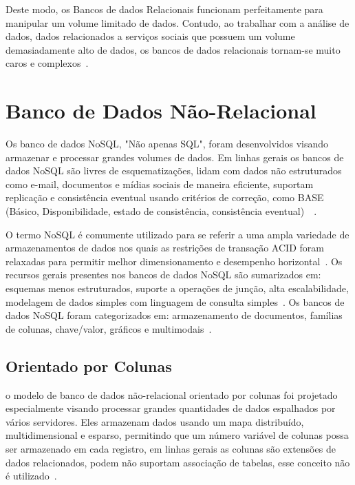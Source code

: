 \documentclass[a4paper,12pt,onecolumn,titlepage]{article}
\begin{document}
Deste modo, os Bancos de dados Relacionais funcionam perfeitamente para manipular um volume limitado de dados. Contudo, ao trabalhar com a análise de dados, dados relacionados a serviços sociais que possuem um volume demasiadamente alto de dados, os bancos de dados relacionais tornam-se muito caros e complexos~\citep{ramesh:2016}.

\section{Banco de Dados Não-Relacional}
\label{sec:nao-relacional}

Os banco de dados NoSQL, "Não apenas SQL", foram desenvolvidos visando armazenar e processar grandes volumes de dados. Em linhas gerais os bancos de dados NoSQL são livres de esquematizações, lidam com dados não estruturados como e-mail, documentos e mídias sociais de maneira eficiente, suportam replicação e consistência eventual usando critérios de correção, como BASE (Básico, Disponibilidade, estado de consistência, consistência eventual)~\citep{mohamed:2014}~\citep{ramesh:2016}.

O termo NoSQL é comumente utilizado para se referir a uma ampla variedade de armazenamentos de dados nos quais as restrições de transação ACID foram relaxadas para permitir melhor dimensionamento e desempenho horizontal~\citep{rafique:2018}. Os recursos gerais presentes nos bancos de dados NoSQL são sumarizados em: esquemas menos estruturados, suporte a operações de junção, alta escalabilidade, modelagem de dados simples com linguagem de consulta simples~\citep{ramesh:2016}. Os bancos de dados NoSQL foram categorizados em: armazenamento de documentos, famílias de colunas, chave/valor, gráficos e multimodais~\citep{aparicio:2016}.

\subsection{Orientado por Colunas}
\label{subsec:colunas}

o modelo de banco de dados não-relacional orientado por colunas foi projetado especialmente visando processar grandes quantidades de dados espalhados por vários servidores. Eles armazenam dados usando um mapa distribuído, multidimensional e esparso, permitindo que um número variável de colunas possa ser armazenado em cada registro, em linhas gerais as colunas são extensões de dados relacionados, podem não suportam associação de tabelas, esse conceito não é utilizado~\citep{patil:2017}. 
\end{document}
